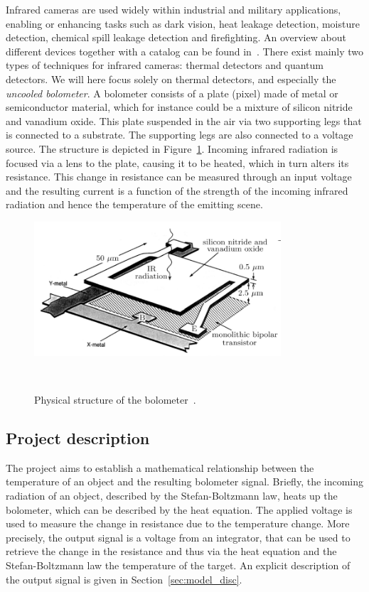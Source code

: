 Infrared cameras are used widely within industrial and military
applications, enabling or enhancing tasks such as dark vision, heat
leakage detection, moisture detection, chemical spill leakage
detection and firefighting. An overview about different devices
together with a catalog can be found in~\cite{flir_handbook}. There
exist mainly two types of techniques for infrared cameras: thermal
detectors and quantum detectors. We will here focus solely on thermal
detectors, and especially the \textit{uncooled bolometer}. A bolometer consists of a plate (pixel)
made of metal or semiconductor material, which for instance could be a mixture of
silicon nitride and vanadium oxide. This plate suspended in the air
via two supporting legs that is connected to a substrate. The
supporting legs are also connected to a voltage
source. The structure is depicted in Figure~\ref{fig:structure}. Incoming infrared radiation is focused via a lens to the
plate, causing it to be heated, which in turn alters its
resistance. This change in resistance can be measured through an
input voltage and the resulting current is a function of the strength
of the incoming infrared radiation and hence
the temperature of the emitting scene.

\begin{figure}[h]
\begin{center}
\includegraphics[height=5cm]{gfx/pixel1.png}
\caption{Physical structure of the bolometer~\cite{xiu2010research}.}~\label{fig:structure}
\end{center}
\end{figure}

\subsection{Project description}

The project aims to establish a mathematical relationship between the
temperature of an object and the resulting bolometer signal. Briefly,
the incoming radiation of an object, described by the Stefan-Boltzmann
law, heats up the bolometer, which can be described by the heat
equation. The applied voltage is used to measure the change in
resistance due to the temperature change. More precisely, the
output signal is a voltage from an integrator, that can be used to
retrieve the change in the resistance and thus via the heat equation
and the Stefan-Boltzmann law the temperature of the target. An explicit
description of the output signal is given in
Section~\ref{sec:model_disc}.


